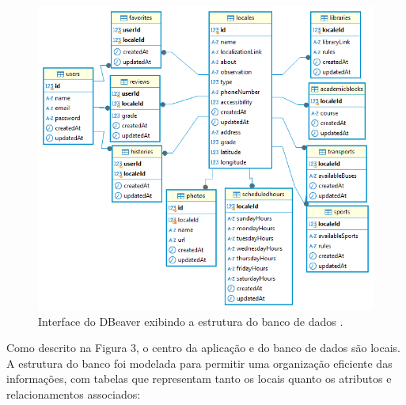 \begin{figure}[h]
    \centering
    \includegraphics[width=1.1\textwidth]{imagens/encontrenaufms.png}
    \caption{\scriptsize Interface do DBeaver exibindo a estrutura do banco de dados \cite{dbeaver}.}
    \label{fig:descricaoBancoDeDados}
\end{figure}

    Como descrito na Figura 3, o centro da aplicação e do banco de dados são locais. A estrutura do banco foi modelada para permitir uma organização eficiente das informações, com tabelas que representam tanto os locais quanto os atributos e relacionamentos associados:

